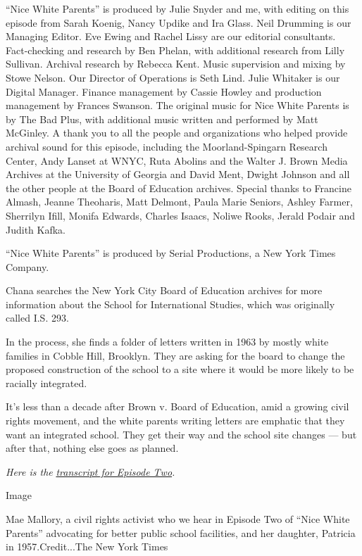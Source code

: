 ``Nice White Parents'' is produced by Julie Snyder and me, with editing
on this episode from Sarah Koenig, Nancy Updike and Ira Glass. Neil
Drumming is our Managing Editor. Eve Ewing and Rachel Lissy are our
editorial consultants. Fact-checking and research by Ben Phelan, with
additional research from Lilly Sullivan. Archival research by Rebecca
Kent. Music supervision and mixing by Stowe Nelson. Our Director of
Operations is Seth Lind. Julie Whitaker is our Digital Manager. Finance
management by Cassie Howley and production management by Frances
Swanson. The original music for Nice White Parents is by The Bad Plus,
with additional music written and performed by Matt McGinley. A thank
you to all the people and organizations who helped provide archival
sound for this episode, including the Moorland-Spingarn Research Center,
Andy Lanset at WNYC, Ruta Abolins and the Walter J. Brown Media Archives
at the University of Georgia and David Ment, Dwight Johnson and all the
other people at the Board of Education archives. Special thanks to
Francine Almash, Jeanne Theoharis, Matt Delmont, Paula Marie Seniors,
Ashley Farmer, Sherrilyn Ifill, Monifa Edwards, Charles Isaacs, Noliwe
Rooks, Jerald Podair and Judith Kafka.

``Nice White Parents'' is produced by Serial Productions, a New York
Times Company.

Chana searches the New York City Board of Education archives for more
information about the School for International Studies, which was
originally called I.S. 293.

In the process, she finds a folder of letters written in 1963 by mostly
white families in Cobble Hill, Brooklyn. They are asking for the board
to change the proposed construction of the school to a site where it
would be more likely to be racially integrated.

It's less than a decade after Brown v. Board of Education, amid a
growing civil rights movement, and the white parents writing letters are
emphatic that they want an integrated school. They get their way and the
school site changes --- but after that, nothing else goes as planned.

\emph{Here is the}
\href{https://www.nytimes3xbfgragh.onion/2020/07/30/podcasts/nice-white-parents-serial-2.html?showTranscript=1}{\emph{transcript
for Episode Two}}\emph{.}

Image

Mae Mallory, a civil rights activist who we hear in Episode Two of
``Nice White Parents'' advocating for better public school facilities,
and her daughter, Patricia in 1957.Credit...The New York Times

